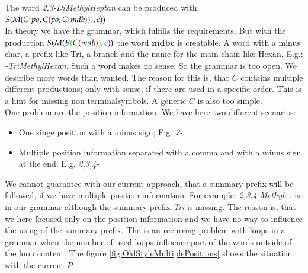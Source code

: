 \documentclass[
fontsize=11pt,
paper=a4,
abstract=true,
numbers=noenddot,
listof=totoc,
bibliography=totoc,
twoside,
open=right,
cleardoublepage=plain,
parskip=half+, %
BCOR=1cm, %
]{scrreprt}
\newcommand{\gerquot}[1]{\glqq#1\grqq}
\newcommand{\colorBracketFirstNesting}{black}
\newcommand{\colorBracketSecondNesting}{blue}
\newcommand{\colorBracketThirdNesting}{green}
\newcommand{\colorBracketFourthNesting}{red}
\newcommand{\colorBracketFifthNesting}{cyan}
\newcommand{\nonterminal}{non terminal}
\begin{document}
\noindent The word \emph{2,3-DiMethylHeptan} can be produced with:
$
S
{\color{\colorBracketFirstNesting}{(}}
    M
    {\color{\colorBracketSecondNesting}{(}}
        C
        {\color{\colorBracketThirdNesting}{(}}
            po,
            C
            {\color{\colorBracketFourthNesting}{(}}
                po,
                C
                {\color{\colorBracketFifthNesting}{(}}
                    mdb
                {\color{\colorBracketFifthNesting}{)}}
            {\color{\colorBracketFourthNesting}{)}}
        {\color{\colorBracketThirdNesting}{)}}
        , c
    {\color{\colorBracketSecondNesting}{)}}
{\color{\colorBracketFirstNesting}{)}}
$\\


In theory we have the grammar, which fulfills the requirements. But with the production
$
S
{\color{\colorBracketFirstNesting}{(}}
    M
    {\color{\colorBracketSecondNesting}{(}}
        B
        {\color{\colorBracketThirdNesting}{(}}
            C
            {\color{\colorBracketFourthNesting}{(}}
                mdb
            {\color{\colorBracketFourthNesting}{)}}
        {\color{\colorBracketThirdNesting}{)}}
        , c
    {\color{\colorBracketSecondNesting}{)}}
{\color{\colorBracketFirstNesting}{)}}
$
the word $\textbf{mdbc}$ is creatable. A word with a minus char, a prefix like \gerquot{Tri}, a branch and the name for the main chain like \gerquot{Hexan}. E.g.: \emph{-TriMethylHexan}. Such a word makes no sense. So the grammar is too open. We describe more words than wanted. The reason for this is, that $C$ contains multiple different productions; only with sense, if there are used in a specific order. This is a hint for missing \nonterminal symbols. A generic $C$ is also too simple.\\

\noindent One problem are the position information. We have here two different scenarios:
\begin{itemize}
    \item One singe position with a minus sign; E.g. \emph{2-}
    \item Multiple position information separated with a comma and with a minus sign at the end. E.g. \emph{2,3,4-}
\end{itemize}
We cannot guarantee with our current approach, that a summary prefix will be followed, if we have multiple position information. For example: \emph{2,3,4-Methyl...} is in our grammar although the summary prefix \emph{Tri} is missing. The reason is, that we here focused only on the position information and we have no way to influence the using of the summary prefix. The is an recurring problem with loops in a grammar when the number of used loops influence part of the words outside of the loop content. The figure \ref{fig:OldStyleMultiplePositions} shows the situation with the current $P$.
\end{document}
